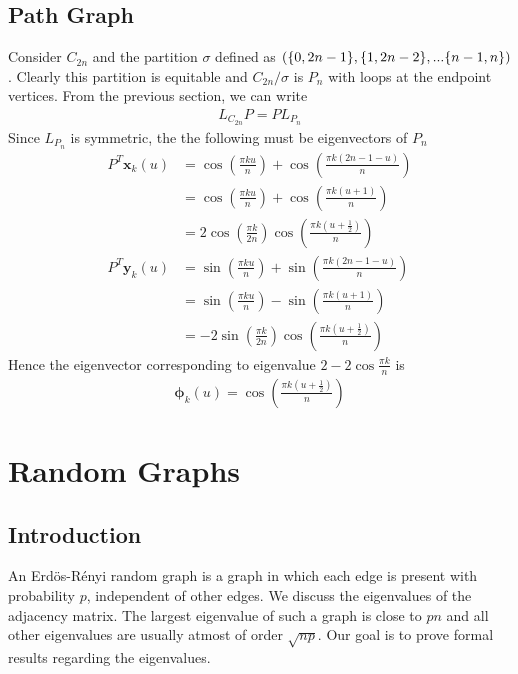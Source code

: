 \documentclass{math}
\renewcommand{\vec}[1]{\boldsymbol{#1}}
\begin{document}
\subsection{Path Graph}

Consider $C_{2n}$ and the partition $\sigma$ defined as $(\{ 0, 2n - 1 \}, \{ 1, 2n - 2 \}, ... \{ n - 1, n \})$.
Clearly this partition is equitable and $C_{2n}/\sigma$ is $P_n$ with loops at the endpoint vertices.
From the previous section, we can write
\begin{align*}
    L_{C_{2n}} P = P L_{P_n}
\end{align*}
Since $L_{P_n}$ is symmetric, the the following must be eigenvectors of $P_n$
\begin{align*}
    P^T \vec{x}_k(u) &= \cos(\frac{\pi k u}{n}) + \cos(\frac{\pi k (2n - 1 - u)}{n}) \\
    &= \cos(\frac{\pi k u}{n}) + \cos(\frac{\pi k (u + 1)}{n}) \\
    &= 2 \cos(\frac{\pi k}{2n}) \cos(\frac{\pi k (u + \frac{1}{2})}{n}) \\
    P^T \vec{y}_k(u) &= \sin(\frac{\pi k u}{n}) + \sin(\frac{\pi k (2n - 1 - u)}{n}) \\
    &= \sin(\frac{\pi k u}{n}) - \sin(\frac{\pi k (u + 1)}{n}) \\
    &= - 2 \sin(\frac{\pi k}{2n}) \cos(\frac{\pi k (u + \frac{1}{2})}{n})
\end{align*}
Hence the eigenvector corresponding to eigenvalue $2 - 2 \cos\frac{\pi k}{n}$ is
\begin{align*}
    \vec{\phi}_k (u) = \cos(\frac{\pi k (u + \frac{1}{2})}{n})
\end{align*}

\section{Random Graphs}

\subsection{Introduction}

An Erd\"{o}s-R\'{e}nyi random graph is a graph in which each edge is present with probability $p$, independent of other edges.
We discuss the eigenvalues of the adjacency matrix.
The largest eigenvalue of such a graph is close to $pn$ and all other eigenvalues are usually atmost of order $\sqrt{np}$.
Our goal is to prove formal results regarding the eigenvalues.
\end{document}
